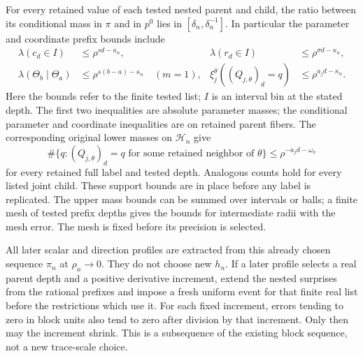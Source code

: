 For every retained value of each tested nested parent and child,
the ratio between its conditional mass in $\pi$ and in $p^0$
lies in $[\delta_n,\delta_n^{-1}]$.  In particular the parameter
and coordinate prefix bounds include
\begin{equation}
 \begin{aligned}
 \lambda(c_d\in I)&\le\rho^{sd-\kappa_n},&
 \lambda(r_d\in I)&\le\rho^{\sigma d-\kappa_n},\\
 \lambda(\Theta_b\mid\Theta_a)
       &\le\rho^{s(b-a)-\kappa_n}\quad(m=1),&
 \xi_j^\theta((Q_{j,\theta})_d=q)
       &\le\rho^{a_jd-\kappa_n}.
 \end{aligned}
 \label{eq:rate-parameter-bounds}
\end{equation}
Here the bounds refer to the finite tested list; $I$ is an interval
bin at the stated depth.  The first two inequalities are absolute
parameter masses; the conditional parameter and coordinate inequalities
are on retained parent fibers.  The corresponding original lower masses
on $\mathcal H_n$ give
\begin{equation}
 \#\{q:(Q_{j,\theta})_d=q
             \text{ for some retained neighbor of }\theta\}
 \le\rho^{-a_jd-\omega_n}
 \label{eq:rate-coordinate-support}
\end{equation}
for every retained full label and tested depth.  Analogous counts
hold for every listed joint child.  These support bounds are in
place before any label is replicated.  The upper mass bounds can
be summed over intervals or balls; a finite mesh of tested prefix
depths gives the bounds for intermediate radii with the mesh error.
The mesh is fixed before its precision is selected.

All later scalar and direction profiles are extracted from this
already chosen sequence $\pi_n$ at $\rho_n\to0$.  They do not
choose new $h_n$.  If a later profile selects a real parent depth
and a positive derivative increment, extend the nested surprises
from the rational prefixes and impose a fresh uniform event for
that finite real list before the restrictions which use it.
For each fixed increment, errors tending to zero in block units
also tend to zero after division by that increment.  Only then may
the increment shrink.  This is a subsequence of the existing block
sequence, not a new trace-scale choice.

